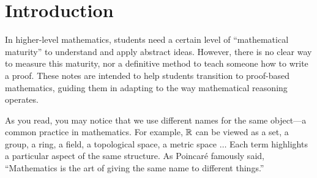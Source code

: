 \documentclass[10pt]{article}
\begin{document}
\def\htitle{An Introduction to Proofs}
\def\hauthor{Hassium}
\hsetup
\htoc
\hmain
\section*{Introduction}
In higher-level mathematics, students need a certain level of ``mathematical maturity'' to understand and apply abstract ideas. However, there is no clear way to measure this maturity, nor a definitive method to teach someone how to write a proof. These notes are intended to help students transition to proof-based mathematics, guiding them in adapting to the way mathematical reasoning operates.
\par
As you read, you may notice that we use different names for the same object—a common practice in mathematics. For example, $\mathbb{R}$ can be viewed as a set, a group, a ring, a field, a topological space, a metric space $\dots$ Each term highlights a particular aspect of the same structure. As Poincaré famously said, ``Mathematics is the art of giving the same name to different things.''
\end{document}
